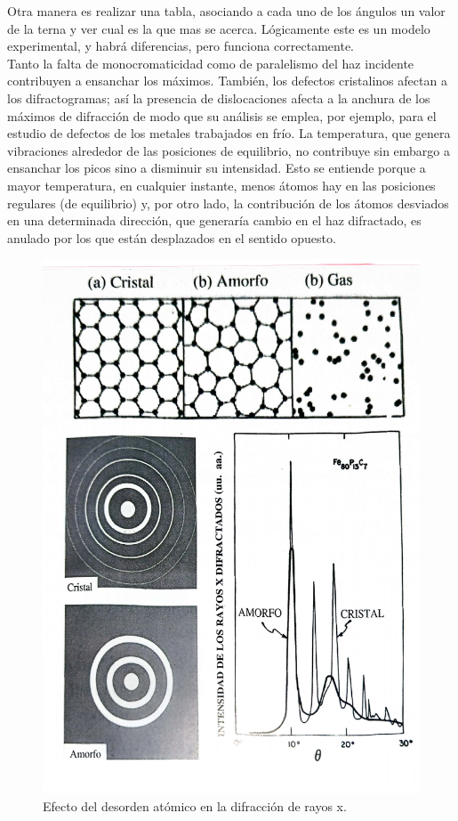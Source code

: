 Otra manera es realizar una tabla, asociando a cada uno de los ángulos un valor de la terna y ver cual es la que mas se acerca. Lógicamente este es un modelo experimental, y habrá diferencias, pero funciona correctamente.  \\

Tanto la falta de monocromaticidad como de paralelismo del haz incidente contribuyen a ensanchar los máximos. También, los defectos cristalinos afectan a los difractogramas; así la presencia de dislocaciones afecta a la anchura de los máximos de difracción de modo que su análisis se emplea, por ejemplo, para el estudio de defectos de los metales trabajados en frío. La temperatura, que genera vibraciones alrededor de las posiciones de equilibrio, no contribuye sin embargo a ensanchar los picos sino a disminuir su intensidad. Esto se entiende porque a mayor temperatura, en cualquier instante, menos átomos hay en las posiciones regulares (de equilibrio) y, por otro lado, la contribución de los átomos desviados en una determinada dirección, que generaría cambio en el haz difractado, es anulado por los que están desplazados en el sentido opuesto. 
    
\begin{figure}[h!] \centering
    \includegraphics[scale=0.40]{Cuerpo/Ch_02/Fotos_libro 9.pdf}
    \caption{Efecto del desorden atómico en la difracción de rayos x.}
    \label{Fig:02-09}
\end{figure}


